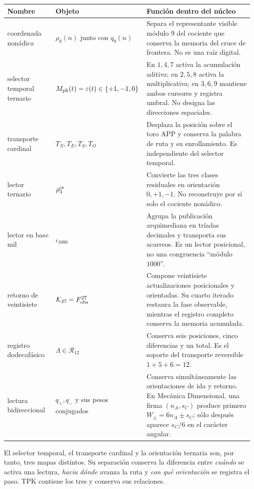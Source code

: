 \begin{longtable}{@{}>{\raggedright\arraybackslash}p{}
>{\raggedright\arraybackslash}p{}
>{\raggedright\arraybackslash}p{}@{}}
\toprule
Nombre&Objeto&Función dentro del núcleo\\\midrule
\endhead
coordenada nonádica&
\(\rho_9(n)\) junto con \(q_9(n)\)&
Separa el representante visible módulo \(9\) del cociente que conserva la
memoria del cruce de frontera. No es una raíz digital.\\
selector temporal ternario&
\(M_{\rm ph}(t)=\varepsilon(t)\in\{+1,-1,0\}\)&
En \(1,4,7\) activa la acumulación aditiva; en \(2,5,8\) activa la
multiplicativa; en \(3,6,9\) mantiene ambos cursores y registra umbral.
No designa las direcciones espaciales.\\
transporte cardinal&
\(T_N,T_E,T_S,T_O\)&
Desplaza la posición sobre el toro APP y conserva la palabra de ruta y su
enrollamiento. Es independiente del selector temporal.\\
lector ternario&
\(\rho_3^{\rm or}\)&
Convierte las tres clases residuales en orientación
\(0,+1,-1\). No reconstruye por sí solo el cociente nonádico.\\
lector en base mil&
\(\iota_{1000}\)&
Agrupa la publicación arquimediana en tríadas decimales y transporta sus
acarreos. Es un lector posicional, no una congruencia ``módulo \(1000\)''.\\
retorno de veintisiete&
\(\mathcal K_{27}=F_{\rm obs}^{27}\)&
Compone veintisiete actualizaciones posicionales y orientadas. Su cuarto
iterado restaura la fase observable, mientras el registro completo conserva
la memoria acumulada.\\
registro dodecafásico&
\(\Lambda\in\mathcal R_{12}\)&
Conserva seis posiciones, cinco diferencias y un total. Es el soporte del
transporte reversible \(1+5+6=12\).\\
lectura bidireccional&
\(q_+,q_-\) y sus pesos conjugados&
Conserva simultáneamente las orientaciones de ida y retorno. En Mecánica
Dimensional, una firma \((n_A,s_C)\) produce primero
\(W_\pm=6n_A\pm s_C\); sólo después aparece
\(s_C/6\) en el carácter angular.\\
\bottomrule
\end{longtable}

El selector temporal, el transporte cardinal y la orientación ternaria son,
por tanto, tres mapas distintos. Su separación conserva la diferencia entre
\emph{cuándo} se activa una lectura, \emph{hacia dónde} avanza la ruta y
\emph{con qué orientación} se registra el paso. TPK contiene los tres y
conserva sus relaciones.

